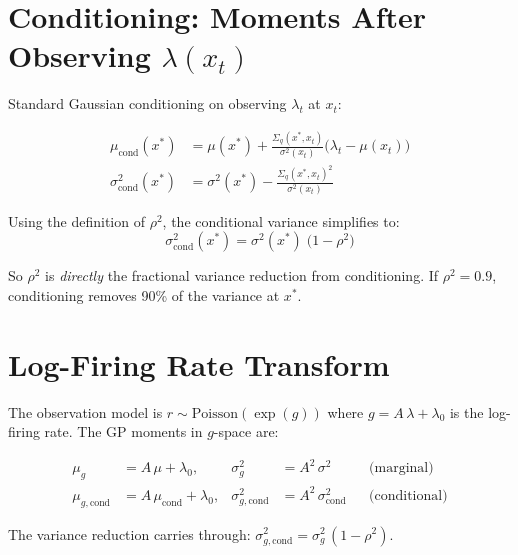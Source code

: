 \documentclass[11pt]{article}
\begin{document}
\section{Conditioning: Moments After Observing $\lambda(x_t)$}

Standard Gaussian conditioning on observing $\lambda_t$ at $x_t$:

\begin{align}
    \mu_{\mathrm{cond}}(x^*)
        &= \mu(x^*) + \frac{\Sigma_q(x^*, x_t)}{\sigma^2(x_t)}
            \bigl(\lambda_t - \mu(x_t)\bigr)
        \label{eq:mu_cond} \\[8pt]
    \sigma^2_{\mathrm{cond}}(x^*)
        &= \sigma^2(x^*) - \frac{\Sigma_q(x^*, x_t)^2}{\sigma^2(x_t)}
        \label{eq:sigma2_cond}
\end{align}

Using the definition of $\rho^2$, the conditional variance simplifies to:
\begin{equation}\label{eq:var_reduction}
    \boxed{\;
    \sigma^2_{\mathrm{cond}}(x^*)
    = \sigma^2(x^*)\;\bigl(1 - \rho^2\bigr)
    \;}
\end{equation}

So $\rho^2$ is \emph{directly} the fractional variance reduction from
conditioning. If $\rho^2 = 0.9$, conditioning removes 90\% of the
variance at $x^*$.

\section{Log-Firing Rate Transform}

The observation model is $r \sim \mathrm{Poisson}(\exp(g))$ where
$g = A\,\lambda + \lambda_0$ is the log-firing rate. The GP moments
in $g$-space are:

\begin{align}
    \mu_g &= A\,\mu + \lambda_0, &
    \sigma^2_g &= A^2\,\sigma^2
        &&\text{(marginal)} \\[4pt]
    \mu_{g,\mathrm{cond}} &= A\,\mu_{\mathrm{cond}} + \lambda_0, &
    \sigma^2_{g,\mathrm{cond}} &= A^2\,\sigma^2_{\mathrm{cond}}
        &&\text{(conditional)}
\end{align}

The variance reduction carries through:
$\sigma^2_{g,\mathrm{cond}} = \sigma^2_g\,(1 - \rho^2)$.
\end{document}

